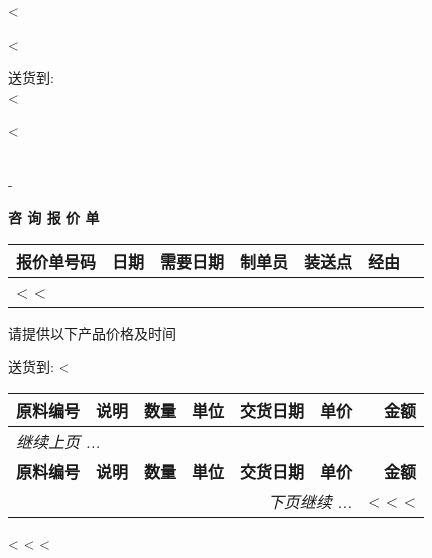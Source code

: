 <%


\begin{CJK}{UTF8}{arialuni}

\vspace*{-3.3cm}
<%
\vspace*{1.5cm}

\parbox[t]{.55\textwidth}{
送货到: \\
<%
}
\parbox[t]{.45\textwidth}{
\vspace{0.3cm}
<%
}

\hfill \\
-
\vspace{1.0cm}

\centerline{\large\bf{咨 询 报 价 单}}
\normalsize
\hfill

\vspace{1cm}


\begin{tabularx}{\textwidth}{*{7}{|X}|} \hline
  \textbf{报价单号码} & \textbf{日期} & \textbf{需要日期} & \textbf{制单员}
  & \textbf{装送点} & \textbf{经由} \\ [0.5em]
  \hline
  <%
  <%
  \hline
\end{tabularx}

\parbox{\textwidth}{
\vspace{1.0cm}
请提供以下产品价格及时间
}

\vspace{0.5cm}
	送货到: <%
\vspace{0.5cm}

\begin{longtable}{|l p{5.5cm} @{\extracolsep\fill} rclrr|} \hline
\xstrut
  \textbf{原料编号} & \textbf{说明} & \textbf{数量} & \textbf{単位}  & \textbf{交货日期} & \textbf{单价} & \textbf{金额} \\     
  \hline
\endfirsthead
  \multicolumn{6}{l}{\emph{继续上页 ...}} \\
  \hline
  \textbf{原料编号} & \textbf{说明} & \textbf{数量} & \textbf{単位}  & \textbf{交货日期} & \textbf{单价} & \textbf{金额} \\     
  \hline
\endhead
   \hline \multicolumn{6}{r}{\emph{下页继续 ...}}
\endfoot
   \hline
\endlastfoot
<%
  <%
  <%
		& <%
	<%
<%
\end{longtable}

\parbox{\textwidth}{
\vspace{0.5cm}
<%
  <%
<%
}

\vfill
\end{CJK}
